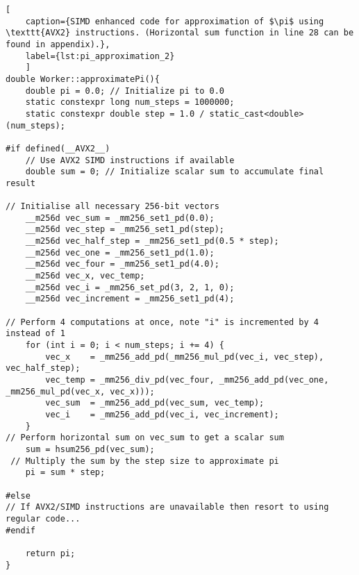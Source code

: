 \begin{lstlisting}[
	caption={SIMD enhanced code for approximation of $\pi$ using \texttt{AVX2} instructions. (Horizontal sum function in line 28 can be found in appendix).},
	label={lst:pi_approximation_2}
	]
double Worker::approximatePi(){
	double pi = 0.0; // Initialize pi to 0.0
	static constexpr long num_steps = 1000000; 
	static constexpr double step = 1.0 / static_cast<double>(num_steps); 
	
#if defined(__AVX2__)
	// Use AVX2 SIMD instructions if available
	double sum = 0; // Initialize scalar sum to accumulate final result
	
// Initialise all necessary 256-bit vectors
	__m256d vec_sum = _mm256_set1_pd(0.0);
	__m256d vec_step = _mm256_set1_pd(step);
	__m256d vec_half_step = _mm256_set1_pd(0.5 * step); 
	__m256d vec_one = _mm256_set1_pd(1.0); 
	__m256d vec_four = _mm256_set1_pd(4.0); 
	__m256d vec_x, vec_temp; 
	__m256d vec_i = _mm256_set_pd(3, 2, 1, 0); 
	__m256d vec_increment = _mm256_set1_pd(4); 

// Perform 4 computations at once, note "i" is incremented by 4 instead of 1
	for (int i = 0; i < num_steps; i += 4) {
		vec_x    = _mm256_add_pd(_mm256_mul_pd(vec_i, vec_step), vec_half_step); 
		vec_temp = _mm256_div_pd(vec_four, _mm256_add_pd(vec_one, _mm256_mul_pd(vec_x, vec_x))); 
		vec_sum  = _mm256_add_pd(vec_sum, vec_temp); 
		vec_i    = _mm256_add_pd(vec_i, vec_increment); 
	}
// Perform horizontal sum on vec_sum to get a scalar sum
	sum = hsum256_pd(vec_sum);
 // Multiply the sum by the step size to approximate pi
	pi = sum * step; 

#else
// If AVX2/SIMD instructions are unavailable then resort to using regular code... 
#endif

	return pi; 
}
\end{lstlisting}

